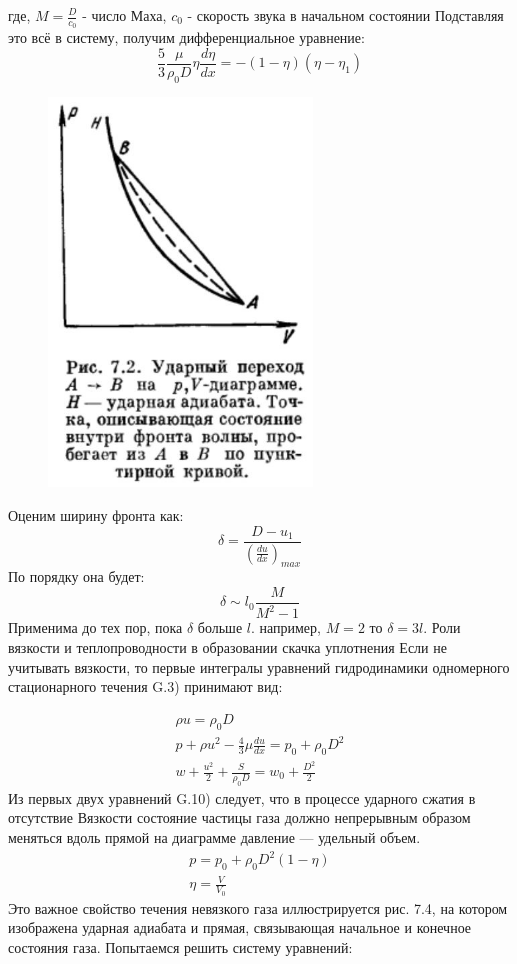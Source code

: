 \documentclass[10pt, a4paper]{article}
\begin{document}
где, $M=\frac{D}{c_0}$ - число Маха, $c_0$ - скорость звука в начальном состоянии 
Подставляя это всё в систему, получим дифференциальное уравнение:
\begin{equation}
	\frac{5}{3} \frac{\mu}{\rho_0 D} \eta \frac{d\eta}{dx}=-(1-\eta)(\eta - \eta_1)
\end{equation}

\begin{figure}[ht]
	\begin{center}
		\includegraphics[width=70mm]{13. adiab udarn.JPG}
	\end{center}
\end{figure}

Оценим ширину фронта как:
\begin{equation}
	\delta = \frac{D-u_1}{(\frac{du}{dx})_{max}}
\end{equation}
По порядку она будет:
\begin{equation}
	\delta \sim l_0 \frac{M}{M^{2}-1}
\end{equation}
Применима до тех пор, пока $\delta$ больше $l$. например, $M=2$ то $\delta=3 l$.
Роли вязкости и теплопроводности в образовании скачка уплотнения 
Если не учитывать вязкости, то первые интегралы уравнений гидродинамики одномерного стационарного течения G.3) принимают вид: 

\begin{eqnarray}
	\rho u = \rho_0 D \\ p+\rho u^{2} - \frac{4}{3} \mu \frac{du}{dx} = p_0 + \rho_0 D^{2} \\ w + \frac{u^{2}}{2} + \frac{S}{\rho_0 D}  = w_0 + \frac{D^{2}}{2}
\end{eqnarray}
Из первых двух уравнений G.10) следует, что в процессе ударного сжатия в отсутствие Вязкости состояние частицы газа должно непрерывным образом меняться вдоль прямой на диаграмме давление — удельный объем. 
\begin{eqnarray}
	p=p_0 + \rho_0 D^{2} (1-\eta) \\ \eta=\frac{V}{V_0}
\end{eqnarray}
Это важное свойство течения невязкого газа иллюстрируется рис. 7.4, на котором изображена ударная адиабата и прямая, связывающая начальное и конечное состояния газа. Попытаемся решить систему уравнений: 
\end{document}
